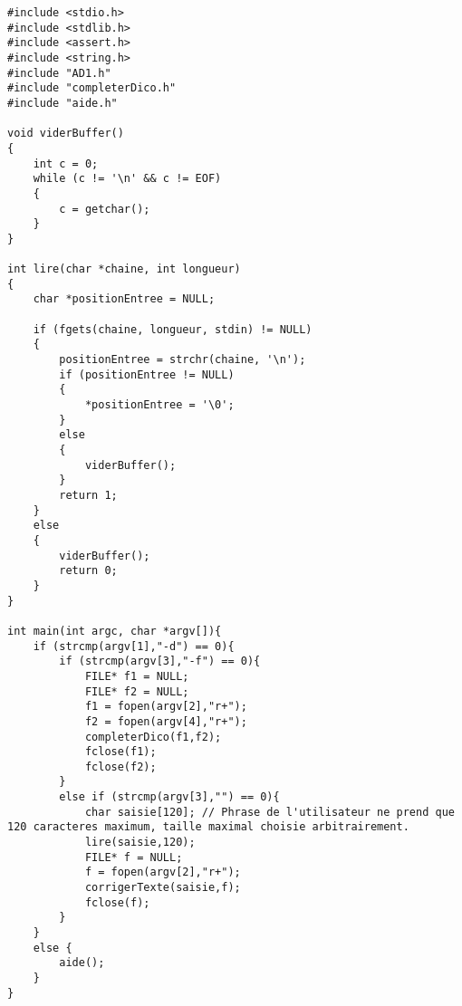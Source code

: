 \documentclass{report}
\begin{document}
 
\begin{lstlisting}
#include <stdio.h>
#include <stdlib.h>
#include <assert.h>
#include <string.h>
#include "AD1.h"
#include "completerDico.h"
#include "aide.h"

void viderBuffer()
{
    int c = 0;
    while (c != '\n' && c != EOF)
    {
        c = getchar();
    }
}
 
int lire(char *chaine, int longueur)
{
    char *positionEntree = NULL;
 
    if (fgets(chaine, longueur, stdin) != NULL)
    {
        positionEntree = strchr(chaine, '\n');
        if (positionEntree != NULL)
        {
            *positionEntree = '\0';
        }
        else
        {
            viderBuffer();
        }
        return 1;
    }
    else
    {
        viderBuffer();
        return 0;
    }
}

int main(int argc, char *argv[]){
    if (strcmp(argv[1],"-d") == 0){
        if (strcmp(argv[3],"-f") == 0){
            FILE* f1 = NULL;
            FILE* f2 = NULL;
            f1 = fopen(argv[2],"r+");
            f2 = fopen(argv[4],"r+");
            completerDico(f1,f2);
            fclose(f1);
            fclose(f2);
        }
        else if (strcmp(argv[3],"") == 0){
            char saisie[120]; // Phrase de l'utilisateur ne prend que 120 caracteres maximum, taille maximal choisie arbitrairement.
            lire(saisie,120);
            FILE* f = NULL;
            f = fopen(argv[2],"r+");
            corrigerTexte(saisie,f);
            fclose(f);
        }
    }
    else {
        aide();
    }
}


 





\end{lstlisting}
 
\end{document}

